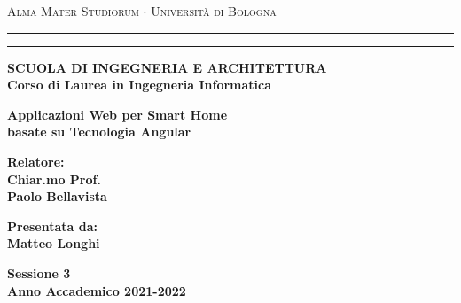 \documentclass[12pt]{report}
\begin{document}
\begin{titlepage}
\begin{center}
{{\Large{\textsc{Alma Mater Studiorum $\cdot$ Universit\`a di
Bologna}}}} \rule[0.1cm]{15.8cm}{0.1mm}
\rule[0.5cm]{15.8cm}{0.6mm}
{\small{\bf SCUOLA DI INGEGNERIA E ARCHITETTURA\\
Corso di Laurea in Ingegneria Informatica }}
\end{center}
\vspace{15mm}
\begin{center}
{\LARGE{\bf Applicazioni Web per Smart Home }}\\
\vspace{3.8mm}
{\LARGE{\bf basate su Tecnologia Angular}}\\
\vspace{3mm}
\end{center}
\vspace{40mm}
\par
\noindent
\begin{minipage}[t]{0.47\textwidth}
{\large{\bf Relatore:\\
Chiar.mo Prof.\\
Paolo Bellavista}}
\vspace{1cm}
\end{minipage}
\hfill
\begin{minipage}[t]{0.47\textwidth}\raggedleft
{\large{\bf Presentata da:\\
Matteo Longhi}}
\end{minipage}
\vspace{20mm}
\begin{center}
{\large{\bf Sessione 3\\
Anno Accademico 2021-2022}}
\end{center}
\end{titlepage}




\newpage
\thispagestyle{empty}
\newpage


\newcommand\blankpage{%
    \null
    \thispagestyle{empty}%
    \addtocounter{page}{-1}%
    \newpage}
\blankpage{}



\tableofcontents 


\newpage
\thispagestyle{empty}
\mbox{}
\newpage

























\newpage
\thispagestyle{empty}
\mbox{}
\newpage



\newpage

\printbibliography
\end{document}
